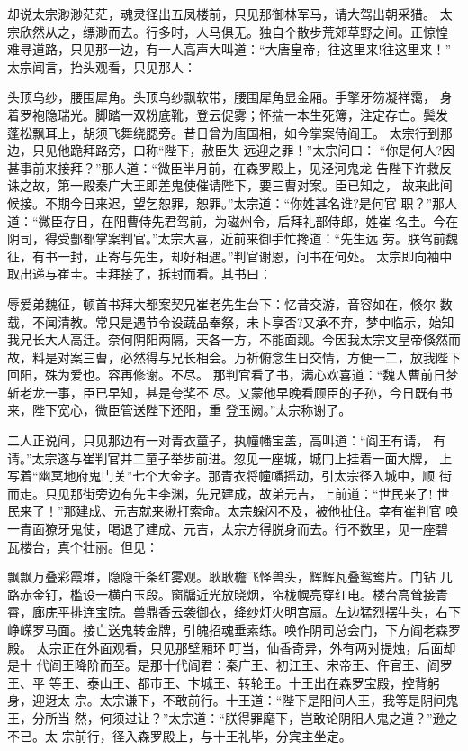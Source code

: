 却说太宗渺渺茫茫，魂灵径出五凤楼前，只见那御林军马，请大驾出朝采猎。
太宗欣然从之，缥渺而去。行多时，人马俱无。独自个散步荒郊草野之间。正惊惶
难寻道路，只见那一边，有一人高声大叫道：“大唐皇帝，往这里来!往这里来！”
太宗闻言，抬头观看，只见那人：

头顶乌纱，腰围犀角。头顶乌纱飘软带，腰围犀角显金厢。手擎牙笏凝祥霭，
身着罗袍隐瑞光。脚踏一双粉底靴，登云促雾；怀揣一本生死簿，注定存亡。鬓发
蓬松飘耳上，胡须飞舞绕腮旁。昔日曾为唐国相，如今掌案侍阎王。
太宗行到那边，只见他跪拜路旁，口称“陛下，赦臣失远迎之罪！”太宗问曰：
“你是何人?因甚事前来接拜？”那人道：“微臣半月前，在森罗殿上，见泾河鬼龙
告陛下许救反诛之故，第一殿秦广大王即差鬼使催请陛下，要三曹对案。臣已知之，
故来此间候接。不期今日来迟，望乞恕罪，恕罪。”太宗道：“你姓甚名谁?是何官
职？”那人道：“微臣存日，在阳曹侍先君驾前，为磁州令，后拜礼部侍郎，姓崔
名圭。今在阴司，得受酆都掌案判官。”太宗大喜，近前来御手忙搀道：“先生远
劳。朕驾前魏征，有书一封，正寄与先生，却好相遇。”判官谢恩，问书在何处。
太宗即向袖中取出递与崔圭。圭拜接了，拆封而看。其书曰：

辱爱弟魏征，顿首书拜大都案契兄崔老先生台下：忆昔交游，音容如在，倏尔
数载，不闻清教。常只是遇节令设蔬品奉祭，未卜享否?又承不弃，梦中临示，始知
我兄长大人高迁。奈何阴阳两隔，天各一方，不能面觌。今因我太宗文皇帝倏然而
故，料是对案三曹，必然得与兄长相会。万祈俯念生日交情，方便一二，放我陛下
回阳，殊为爱也。容再修谢。不尽。
那判官看了书，满心欢喜道：“魏人曹前日梦斩老龙一事，臣已早知，甚是夸奖不
尽。又蒙他早晚看顾臣的子孙，今日既有书来，陛下宽心，微臣管送陛下还阳，重
登玉阙。”太宗称谢了。

二人正说间，只见那边有一对青衣童子，执幢幡宝盖，高叫道：“阎王有请，
有请。”太宗遂与崔判官并二童子举步前进。忽见一座城，城门上挂着一面大牌，
上写着“幽冥地府鬼门关”七个大金字。那青衣将幢幡摇动，引太宗径入城中，顺
街而走。只见那街旁边有先主李渊，先兄建成，故弟元吉，上前道：“世民来了!
世民来了！”那建成、元吉就来揪打索命。太宗躲闪不及，被他扯住。幸有崔判官
唤一青面獠牙鬼使，喝退了建成、元吉，太宗方得脱身而去。行不数里，见一座碧
瓦楼台，真个壮丽。但见：

飘飘万叠彩霞堆，隐隐千条红雾观。耿耿檐飞怪兽头，辉辉瓦叠鸳鸯片。门钻
几路赤金钉，槛设一横白玉段。窗牖近光放晓烟，帘栊幌亮穿红电。楼台高耸接青
霄，廊庑平排连宝院。兽鼎香云袭御衣，绛纱灯火明宫扇。左边猛烈摆牛头，右下
峥嵘罗马面。接亡送鬼转金牌，引魄招魂垂素练。唤作阴司总会门，下方阎老森罗
殿。
太宗正在外面观看，只见那壁厢环叮当，仙香奇异，外有两对提烛，后面却是十
代阎王降阶而至。是那十代阎君：秦广王、初江王、宋帝王、仵官王、阎罗王、平
等王、泰山王、都市王、卞城王、转轮王。十王出在森罗宝殿，控背躬身，迎迓太
宗。太宗谦下，不敢前行。十王道：“陛下是阳间人王，我等是阴间鬼王，分所当
然，何须过让？”太宗道：“朕得罪麾下，岂敢论阴阳人鬼之道？”逊之不已。太
宗前行，径入森罗殿上，与十王礼毕，分宾主坐定。

